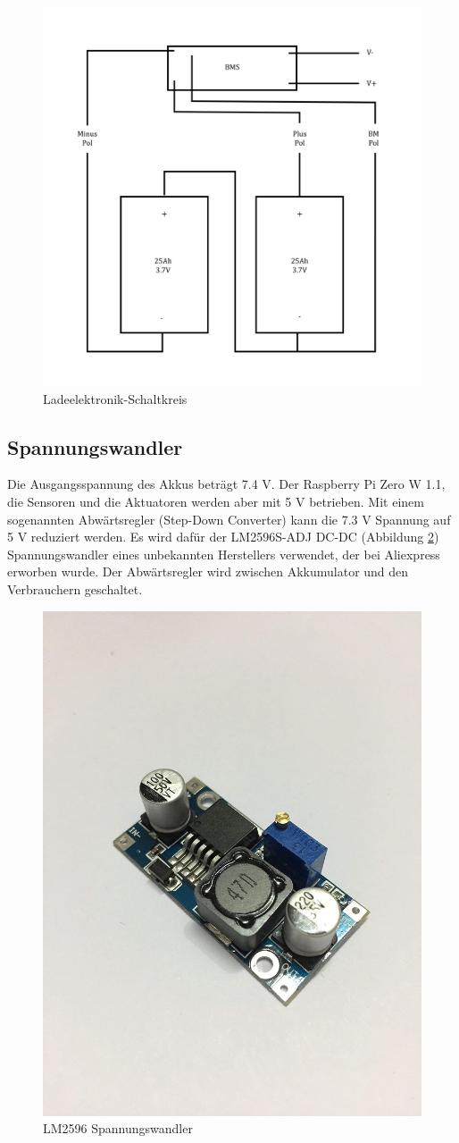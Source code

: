 \begin{figure}[H]
    \centering
    \includegraphics[width=0.5\linewidth]{assets/bms_graphic.png}
    \caption{Ladeelektronik-Schaltkreis}
    \label{fig:enter-label}
\end{figure}
\subsection{Spannungswandler}
Die Ausgangsspannung des Akkus beträgt 7.4 V. Der Raspberry Pi Zero W 1.1, die Sensoren und die Aktuatoren werden aber mit 5 V betrieben. Mit einem sogenannten Abwärtsregler (Step-Down Converter) kann die 7.3 V Spannung auf 5 V reduziert werden. Es wird dafür der LM2596S-ADJ DC-DC (Abbildung \ref{fig:lm25}) Spannungswandler eines unbekannten Herstellers verwendet, der bei Aliexpress erworben wurde. Der Abwärtsregler wird zwischen Akkumulator und den Verbrauchern geschaltet.

\begin{figure}
    \centering
    \includegraphics[width=0.5\linewidth]{assets/Spannungsregeler.png}
    \caption{LM2596 Spannungswandler}
    \label{fig:lm25}
\end{figure}


